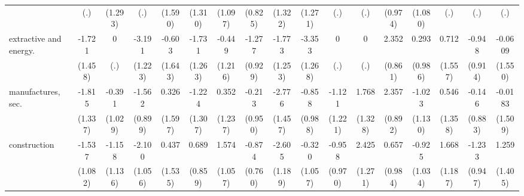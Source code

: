 {\begin{tabular}{l*{16}{c}}
                    &         (.)         &     (1.293)         &         (.)         &     (1.590)         &     (1.310)         &     (1.097)         &     (0.825)         &     (1.322)         &     (1.271)         &         (.)         &         (.)         &     (0.974)         &     (1.080)         &         (.)         &         (.)         &         (.)         \\
[1em]
extractive and energy.&      -1.721         &           0         &      -3.191\sym{**} &      -0.603         &      -1.731         &      -0.449         &      -1.277         &      -1.773         &      -3.353\sym{**} &           0         &           0         &       2.352\sym{**} &       0.293         &       0.712         &      -0.948         &     -0.0609         \\
                    &     (1.458)         &         (.)         &     (1.223)         &     (1.643)         &     (1.263)         &     (1.216)         &     (0.929)         &     (1.253)         &     (1.268)         &         (.)         &         (.)         &     (0.861)         &     (0.986)         &     (1.557)         &     (0.914)         &     (1.550)         \\
[1em]
manufactures, sec.  &      -1.815         &      -0.391         &      -1.562         &       0.326         &      -1.224         &       0.352         &      -0.213         &      -2.776         &      -0.858         &      -1.121         &       1.768         &       2.357\sym{**} &      -1.023         &       0.546         &      -0.146         &     -0.0183         \\
                    &     (1.337)         &     (1.029)         &     (0.899)         &     (1.597)         &     (1.307)         &     (1.237)         &     (0.950)         &     (1.457)         &     (0.988)         &     (1.221)         &     (1.328)         &     (0.892)         &     (1.130)         &     (1.358)         &     (0.883)         &     (1.509)         \\
[1em]
construction        &      -1.537         &      -1.158         &      -2.100\sym{*}  &       0.437         &       0.689         &       1.574         &      -0.874         &      -2.605\sym{*}  &      -0.320         &      -0.958         &       2.425         &       0.657         &      -0.925         &       1.668         &      -1.233         &       1.259         \\
                    &     (1.082)         &     (1.136)         &     (1.056)         &     (1.535)         &     (0.859)         &     (1.057)         &     (0.760)         &     (1.189)         &     (1.057)         &     (0.970)         &     (1.271)         &     (0.984)         &     (1.034)         &     (1.187)         &     (0.947)         &     (1.405)         \\

\end{tabular}}
